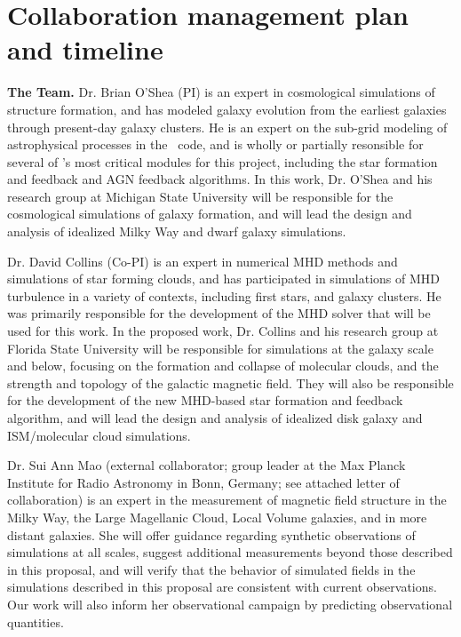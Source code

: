 \vspace{-4mm}
\section{Collaboration management plan and timeline}
\label{sec:timeline}
\vspace{-3mm}

\textbf{The Team.}  
Dr. Brian O'Shea (PI) is an expert in cosmological simulations of
structure formation, and has modeled galaxy evolution from the
earliest galaxies through present-day galaxy clusters.  He is an
expert on the sub-grid modeling of astrophysical processes in the
\enzo\ code, and is wholly or partially resonsible for several of
\enzo's most critical modules for this project, including the star
formation and feedback and AGN feedback algorithms.  In this work,
Dr. O'Shea and his research group at Michigan State University will be
responsible for the cosmological simulations of galaxy formation, and
will lead the design and analysis of idealized Milky Way and dwarf
galaxy simulations.

Dr. David Collins (Co-PI) is an expert in numerical MHD methods and
simulations of star forming clouds, and has participated in
simulations of MHD turbulence in a variety of contexts, including
first stars, and galaxy clusters.  He was primarily responsible for
the development of the MHD solver that will be used for this work.  In
the proposed work, Dr. Collins and his research group at Florida State
University will be responsible for simulations at the galaxy scale and
below, focusing on the formation and collapse of molecular clouds, and
the strength and topology of the galactic magnetic field.  They will
also be responsible for the development of the new MHD-based star
formation and feedback algorithm, and will lead the design and
analysis of idealized disk galaxy and ISM/molecular cloud simulations.

Dr. Sui Ann Mao (external collaborator; group leader at the Max Planck
Institute for Radio Astronomy in Bonn, Germany; see attached letter of
collaboration) is an expert in the
measurement of magnetic field structure in the Milky Way, the Large
Magellanic Cloud, 
Local Volume galaxies,
and in more distant galaxies. She will offer
guidance regarding synthetic observations of simulations at all
scales, suggest additional measurements beyond those described in this
proposal, and will verify that the behavior of simulated fields in the
simulations described in this proposal are consistent with current
observations.  Our work will also inform her observational campaign by
predicting observational quantities.


